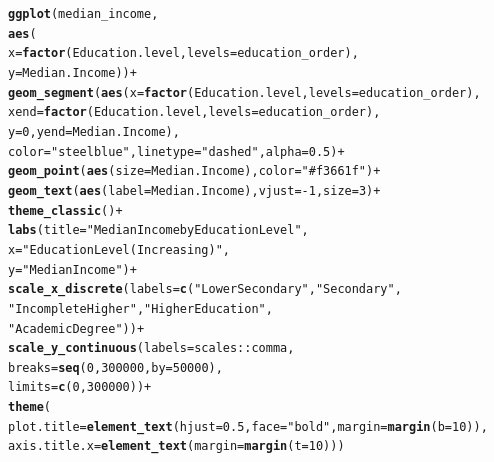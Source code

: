 \documentclass{article}\usepackage[]{graphicx}\usepackage[]{xcolor}
\makeatletter
\newcommand{\hlnum}[1]{\textcolor[rgb]{0.686,0.059,0.569}{#1}}%
\newcommand{\hlsng}[1]{\textcolor[rgb]{0.192,0.494,0.8}{#1}}%
\newcommand{\hlopt}[1]{\textcolor[rgb]{0,0,0}{#1}}%
\newcommand{\hldef}[1]{\textcolor[rgb]{0.345,0.345,0.345}{#1}}%
\newcommand{\hlkwc}[1]{\textcolor[rgb]{0.333,0.667,0.333}{#1}}%
\newcommand{\hlkwd}[1]{\textcolor[rgb]{0.737,0.353,0.396}{\textbf{#1}}}%
\newenvironment{kframe}{%
 \def\at@end@of@kframe{}%
 \ifinner\ifhmode%
  \def\at@end@of@kframe{\end{minipage}}%
  \begin{minipage}{\columnwidth}%
 \fi\fi%
 \def\FrameCommand##1{\hskip\@totalleftmargin \hskip-\fboxsep
 \colorbox{shadecolor}{##1}\hskip-\fboxsep
     \hskip-\linewidth \hskip-\@totalleftmargin \hskip\columnwidth}%
 \MakeFramed {\advance\hsize-\width
   \@totalleftmargin\z@ \linewidth\hsize
   \@setminipage}}%
 {\par\unskip\endMakeFramed%
 \at@end@of@kframe}
\newenvironment{knitrout}{}{} %
\makeatother
\begin{document}
\begin{knitrout}
\begin{kframe}
\begin{alltt}
\hlkwd{ggplot}\hldef{(median_income,}
       \hlkwd{aes}\hldef{(}
         \hlkwc{x} \hldef{=} \hlkwd{factor}\hldef{(Education.level,} \hlkwc{levels} \hldef{= education_order),}
         \hlkwc{y} \hldef{= Median.Income))} \hlopt{+}
  \hlkwd{geom_segment}\hldef{(}\hlkwd{aes}\hldef{(}\hlkwc{x} \hldef{=} \hlkwd{factor}\hldef{(Education.level,} \hlkwc{levels} \hldef{= education_order),}
                   \hlkwc{xend} \hldef{=} \hlkwd{factor}\hldef{(Education.level,} \hlkwc{levels} \hldef{= education_order),}
                   \hlkwc{y} \hldef{=} \hlnum{0}\hldef{,} \hlkwc{yend} \hldef{= Median.Income),}
               \hlkwc{color} \hldef{=} \hlsng{"steelblue"}\hldef{,} \hlkwc{linetype} \hldef{=} \hlsng{"dashed"}\hldef{,} \hlkwc{alpha} \hldef{=} \hlnum{0.5}\hldef{)} \hlopt{+}
  \hlkwd{geom_point}\hldef{(}\hlkwd{aes}\hldef{(}\hlkwc{size} \hldef{= Median.Income),} \hlkwc{color} \hldef{=} \hlsng{"#f3661f"}\hldef{)} \hlopt{+}
  \hlkwd{geom_text}\hldef{(}\hlkwd{aes}\hldef{(}\hlkwc{label} \hldef{= Median.Income),} \hlkwc{vjust} \hldef{=} \hlopt{-}\hlnum{1}\hldef{,} \hlkwc{size} \hldef{=} \hlnum{3}\hldef{)} \hlopt{+}
  \hlkwd{theme_classic}\hldef{()} \hlopt{+}
  \hlkwd{labs}\hldef{(}\hlkwc{title} \hldef{=} \hlsng{"Median Income by Education Level"}\hldef{,}
       \hlkwc{x} \hldef{=} \hlsng{"Education Level (Increasing)"}\hldef{,}
       \hlkwc{y} \hldef{=} \hlsng{"Median Income"}\hldef{)} \hlopt{+}
  \hlkwd{scale_x_discrete}\hldef{(}\hlkwc{labels} \hldef{=} \hlkwd{c}\hldef{(}\hlsng{"Lower Secondary"}\hldef{,} \hlsng{"Secondary"}\hldef{,}
                              \hlsng{"Incomplete Higher"}\hldef{,} \hlsng{"Higher Education"}\hldef{,}
                              \hlsng{"Academic Degree"}\hldef{))} \hlopt{+}
  \hlkwd{scale_y_continuous}\hldef{(}\hlkwc{labels} \hldef{= scales}\hlopt{::}\hldef{comma,}
                     \hlkwc{breaks} \hldef{=} \hlkwd{seq}\hldef{(}\hlnum{0}\hldef{,} \hlnum{300000}\hldef{,} \hlkwc{by} \hldef{=} \hlnum{50000}\hldef{),}
                     \hlkwc{limits} \hldef{=} \hlkwd{c}\hldef{(}\hlnum{0}\hldef{,} \hlnum{300000}\hldef{))} \hlopt{+}
  \hlkwd{theme}\hldef{(}
    \hlkwc{plot.title} \hldef{=} \hlkwd{element_text}\hldef{(}\hlkwc{hjust} \hldef{=} \hlnum{0.5}\hldef{,} \hlkwc{face} \hldef{=} \hlsng{"bold"}\hldef{,} \hlkwc{margin} \hldef{=} \hlkwd{margin}\hldef{(}\hlkwc{b} \hldef{=} \hlnum{10}\hldef{)),}
    \hlkwc{axis.title.x} \hldef{=} \hlkwd{element_text}\hldef{(}\hlkwc{margin} \hldef{=} \hlkwd{margin}\hldef{(}\hlkwc{t} \hldef{=} \hlnum{10}\hldef{)))}
\end{alltt}
\end{kframe}\begin{figure}[H]

\end{figure}
\end{knitrout}
\end{document}
